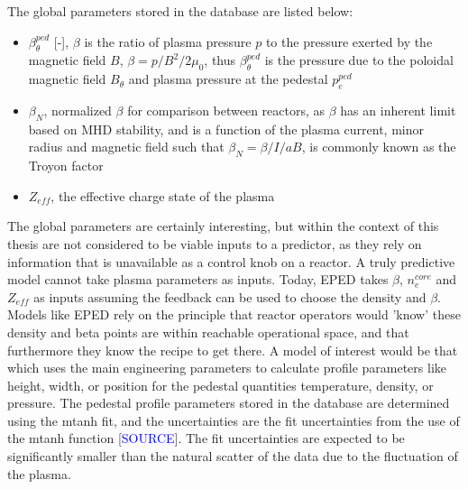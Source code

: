 \documentclass[a4paper, twoside, final, 12pt]{article}
\begin{document}
The global parameters stored in the database are listed below: 
\begin{itemize}
	\item $\beta_\theta^{ped}$ [-], $\beta$ is the ratio of plasma pressure $p$ to the pressure exerted by the magnetic field $B$, $\beta = p / B^2 / 2\mu_0$, thus $\beta_\theta^{ped}$ is the pressure due to the poloidal magnetic field $B_\theta$ and plasma pressure at the pedestal $p_e^{ped}$
	\item $\beta_N$, normalized $\beta$ for comparison between reactors, as $\beta$ has an inherent limit based on MHD stability, and is a function of the plasma current, minor radius and magnetic field such that $\beta_N = \beta / I / aB$, is commonly known as the Troyon factor
	\item $Z_{eff}$, the effective charge state of the plasma
\end{itemize}

The global parameters are certainly interesting, but within the context of this thesis are not considered to be viable inputs to a predictor, as they rely on information that is unavailable as a control knob on a reactor.
A truly predictive model cannot take plasma parameters as inputs. Today, EPED takes $\beta$, $n_e^{core}$ and $Z_{eff}$ as inputs assuming the feedback can be used to choose the density and $\beta$.
Models like EPED rely on the principle that reactor operators would 'know' these density and beta points are within reachable operational space, and that furthermore they know the recipe to get there.
A model of interest would be that which uses the main engineering parameters to calculate profile parameters like height, width, or position for the pedestal quantities temperature, density, or pressure.
The pedestal profile parameters stored in the database are determined using the mtanh fit, and the uncertainties are the fit uncertainties from the use of the mtanh function [\textcolor{blue}{SOURCE}].
The fit uncertainties are expected to be significantly smaller than the natural scatter of the data due to the fluctuation of the plasma.
\end{document}
